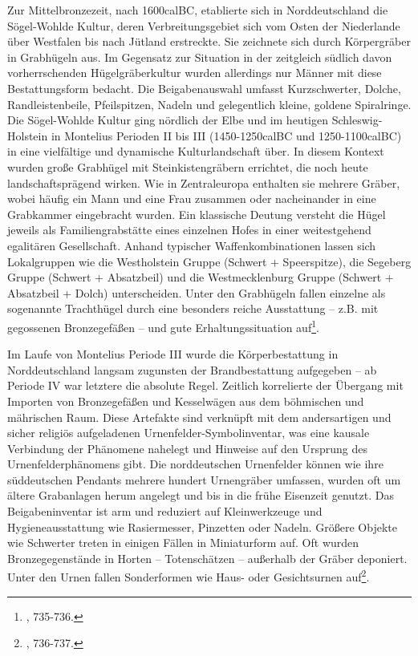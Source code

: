 \documentclass[openany,twoside,twocolumn]{book}
\let\rmarkdownfootnote\footnote%
\def\footnote{\protect\rmarkdownfootnote}
\begin{document}
Zur Mittelbronzezeit, nach 1600calBC, etablierte sich in Norddeutschland
die Sögel-Wohlde Kultur, deren Verbreitungsgebiet sich vom Osten der
Niederlande über Westfalen bis nach Jütland erstreckte. Sie zeichnete
sich durch Körpergräber in Grabhügeln aus. Im Gegensatz zur Situation in
der zeitgleich südlich davon vorherrschenden Hügelgräberkultur wurden
allerdings nur Männer mit diese Bestattungsform bedacht. Die
Beigabenauswahl umfasst Kurzschwerter, Dolche, Randleistenbeile,
Pfeilspitzen, Nadeln und gelegentlich kleine, goldene Spiralringe. Die
Sögel-Wohlde Kultur ging nördlich der Elbe und im heutigen
Schleswig-Holstein in Montelius Perioden II bis III (1450-1250calBC und
1250-1100calBC) in eine vielfältige und dynamische Kulturlandschaft
über. In diesem Kontext wurden große Grabhügel mit Steinkistengräbern
errichtet, die noch heute landschaftsprägend wirken. Wie in
Zentraleuropa enthalten sie mehrere Gräber, wobei häufig ein Mann und
eine Frau zusammen oder nacheinander in eine Grabkammer eingebracht
wurden. Ein klassische Deutung versteht die Hügel jeweils als
Familiengrabstätte eines einzelnen Hofes in einer weitestgehend
egalitären Gesellschaft. Anhand typischer Waffenkombinationen lassen
sich Lokalgruppen wie die Westholstein Gruppe (Schwert + Speerspitze),
die Segeberg Gruppe (Schwert + Absatzbeil) und die Westmecklenburg
Gruppe (Schwert + Absatzbeil + Dolch) unterscheiden. Unter den
Grabhügeln fallen einzelne als sogenannte Trachthügel durch eine
besonders reiche Ausstattung -- z.B. mit gegossenen Bronzegefäßen -- und
gute Erhaltungssituation auf\footnote{\textcite{jockenhovel_germany_2013},
  735-736.}.

Im Laufe von Montelius Periode III wurde die Körperbestattung in
Norddeutschland langsam zugunsten der Brandbestattung aufgegeben -- ab
Periode IV war letztere die absolute Regel. Zeitlich korrelierte der
Übergang mit Importen von Bronzegefäßen und Kesselwägen aus dem
böhmischen und mährischen Raum. Diese Artefakte sind verknüpft mit dem
andersartigen und sicher religiös aufgeladenen
Urnenfelder-Symbolinventar, was eine kausale Verbindung der Phänomene
nahelegt und Hinweise auf den Ursprung des Urnenfelderphänomens gibt.
Die norddeutschen Urnenfelder können wie ihre süddeutschen Pendants
mehrere hundert Urnengräber umfassen, wurden oft um ältere Grabanlagen
herum angelegt und bis in die frühe Eisenzeit genutzt. Das
Beigabeninventar ist arm und reduziert auf Kleinwerkzeuge und
Hygieneausstattung wie Rasiermesser, Pinzetten oder Nadeln. Größere
Objekte wie Schwerter treten in einigen Fällen in Miniaturform auf. Oft
wurden Bronzegegenstände in Horten -- Totenschätzen -- außerhalb der
Gräber deponiert. Unter den Urnen fallen Sonderformen wie Haus- oder
Gesichtsurnen auf\footnote{\textcite{jockenhovel_germany_2013}, 736-737.}.
\end{document}
